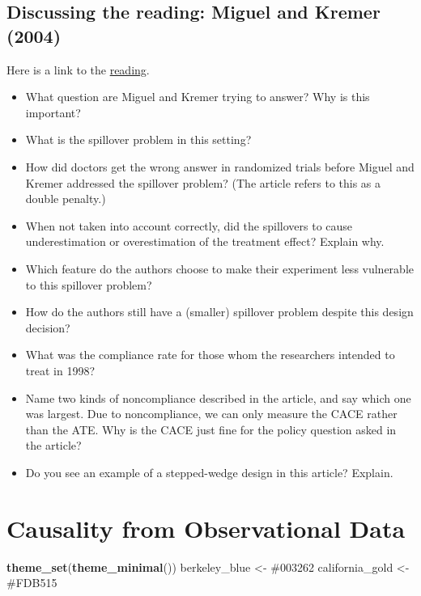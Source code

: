 \documentclass[
]{article}
\newenvironment{Shaded}{\begin{snugshade}}{\end{snugshade}}
\newcommand{\FunctionTok}[1]{\textcolor[rgb]{0.13,0.29,0.53}{\textbf{#1}}}
\newcommand{\NormalTok}[1]{#1}
\newcommand{\OtherTok}[1]{\textcolor[rgb]{0.56,0.35,0.01}{#1}}
\newcommand{\StringTok}[1]{\textcolor[rgb]{0.31,0.60,0.02}{#1}}
\providecommand{\tightlist}{%
  \setlength{\itemsep}{0pt}\setlength{\parskip}{0pt}}
\theoremstyle{definition}
\theoremstyle{definition}
\theoremstyle{definition}
\theoremstyle{definition}
\theoremstyle{remark}
\begin{document}
\subsection{Discussing the reading: Miguel and Kremer (2004)}\label{discussing-the-reading-miguel-and-kremer-2004}

Here is a link to the \href{https://github.com/UC-Berkeley-I-School/mids-w241/blob/main/readings/Miguel.2004.pdf}{reading}.

\begin{itemize}
\tightlist
\item
  What question are Miguel and Kremer trying to answer? Why is this important?\\
\item
  What is the spillover problem in this setting?
\item
  How did doctors get the wrong answer in randomized trials before Miguel and Kremer addressed the spillover problem? (The article refers to this as a double penalty.)
\item
  When not taken into account correctly, did the spillovers to cause underestimation or overestimation of the treatment effect? Explain why.
\item
  Which feature do the authors choose to make their experiment less vulnerable to this spillover problem?
\item
  How do the authors still have a (smaller) spillover problem despite this design decision?
\item
  What was the compliance rate for those whom the researchers intended to treat in 1998?
\item
  Name two kinds of noncompliance described in the article, and say which one was largest.
  Due to noncompliance, we can only measure the CACE rather than the ATE. Why is the CACE just fine for the policy question asked in the article?
\item
  Do you see an example of a stepped-wedge design in this article? Explain.
\end{itemize}

\section{Causality from Observational Data}\label{causality-from-observational-data}

\begin{Shaded}
\begin{Highlighting}[]
\FunctionTok{theme\_set}\NormalTok{(}\FunctionTok{theme\_minimal}\NormalTok{())}
\NormalTok{berkeley\_blue   }\OtherTok{\textless{}{-}} \StringTok{\textquotesingle{}\#003262\textquotesingle{}}
\NormalTok{california\_gold }\OtherTok{\textless{}{-}} \StringTok{\textquotesingle{}\#FDB515\textquotesingle{}}
\end{Highlighting}
\end{Shaded}
\end{document}
